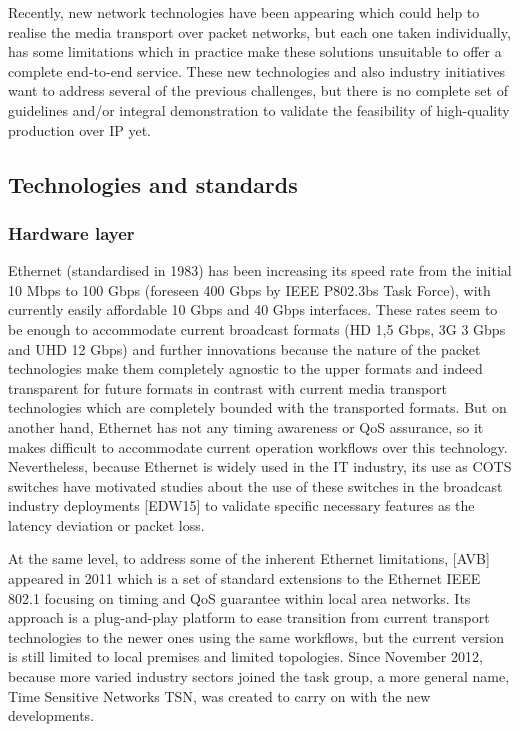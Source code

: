 Recently, new network technologies have been appearing which could help to realise the media
transport over packet networks, but each one taken individually, has some limitations which in
practice make these solutions unsuitable to offer a complete end-to-end service. These new
technologies and also industry initiatives want to address several of the previous
challenges, but there is no complete set of guidelines and/or integral demonstration to validate the
feasibility of high-quality production over IP yet.

\subsection{Technologies and standards}

\subsubsection{Hardware layer}

Ethernet (standardised in 1983) has been increasing its speed rate from the initial 10 Mbps to
100 Gbps (foreseen 400 Gbps by IEEE P802.3bs Task Force), with currently easily affordable 10 Gbps and 40 Gbps interfaces. These rates seem to be enough to accommodate current broadcast formats (HD 1,5 Gbps,
3G 3 Gbps and UHD 12 Gbps) and further innovations because the nature of the packet technologies
make them completely agnostic to the upper formats and indeed transparent for future formats in
contrast with current media transport technologies which are completely bounded with the transported
formats. But on another hand, Ethernet has not any timing awareness or QoS assurance, so it makes
difficult to accommodate current operation workflows over this technology. Nevertheless, because
Ethernet is widely used in the IT industry, its use as COTS switches have motivated studies about the
use of these switches in the broadcast industry deployments [EDW15] to validate specific necessary
features as the latency deviation or packet loss.

At the same level, to address some of the inherent Ethernet limitations, [AVB] appeared in 2011
which is a set of standard extensions to the Ethernet IEEE 802.1 focusing on timing and QoS
guarantee within local area networks. Its approach is a plug-and-play platform to ease transition from
current transport technologies to the newer ones using the same workflows, but the current version is
still limited to local premises and limited topologies. Since November 2012, because more varied
industry sectors joined the task group, a more general name, Time Sensitive Networks TSN, was
created to carry on with the new developments.

